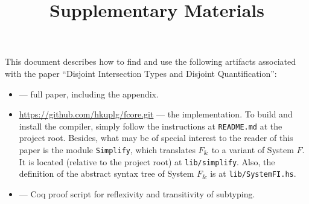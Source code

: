 \documentclass{article}
\begin{document}
\title{Supplementary Materials}
\maketitle

This document describes how to find and use the following artifacts associated
with the paper ``Disjoint Intersection Types and Disjoint Quantification'':

\begin{itemize}
  \item {} --- full paper, including the appendix.

  \item \url{https://github.com/hkuplg/fcore.git} --- the implementation. To build and install the
  compiler, simply follow the instructions at \texttt{README.md} at the project
  root. Besides, what may be of special interest to the reader of this paper is
  the module \texttt{Simplify}, which translates $ F_\&$ to a variant of System
  $F$. It is located (relative to the project root) at \texttt{lib/simplify}.
  Also, the definition of the abstract syntax tree of System $F_\&$ is at
  \texttt{lib/SystemFI.hs}.

  \item {} --- Coq proof script for reflexivity and transitivity of subtyping.
\end{itemize}
\end{document}

